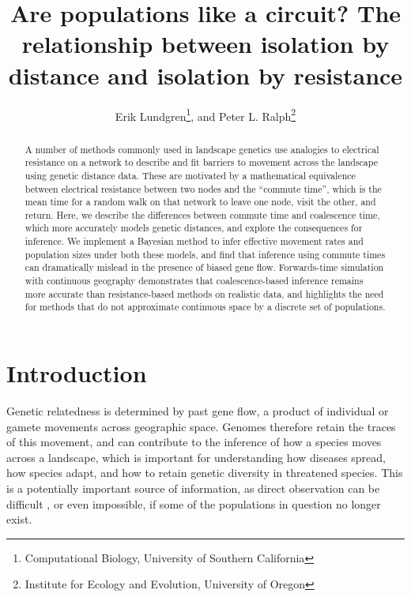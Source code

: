 \documentclass{article}
\begin{document}
\title{Are populations like a circuit? The relationship between isolation by distance and isolation by resistance}
\author{Erik Lundgren\footnote{Computational Biology, University of Southern California}, and
        Peter L. Ralph\footnote{Institute for Ecology and Evolution, University of Oregon}}
\maketitle

\begin{abstract}
A number of methods commonly used in landscape genetics
use analogies to electrical resistance on a network
to describe and fit barriers to movement across the landscape
using genetic distance data.
These are motivated by a mathematical equivalence between electrical resistance between two nodes
and the ``commute time'',
which is the mean time for a random walk on that network to leave one node, visit the other, and return.
Here, we describe the differences between commute time
and coalescence time, which more accurately models genetic distances,
and explore the consequences for inference.
We implement a Bayesian method to infer effective movement rates and population sizes 
under both these models,
and find that inference using commute times
can dramatically mislead in the presence of biased gene flow.
Forwards-time simulation with continuous geography demonstrates that
coalescence-based inference remains more accurate than resistance-based methods on realistic data,
and highlights the need for methods that do not approximate continuous space
by a discrete set of populations.
\end{abstract}


\section*{Introduction}

Genetic relatedness is determined by past gene flow,
a product of individual or gamete movements across geographic space.
Genomes therefore retain the traces of this movement,
and can contribute to the inference of how a species moves across a landscape,
which is important for understanding how diseases spread, how species adapt,
and how to retain genetic diversity in threatened species.
This is a potentially important source of information,
as direct observation can be difficult \citep[especially of long-distance movement]{dispersal_estimation},
or even impossible, if some of the populations in question no longer exist.
\end{document}
